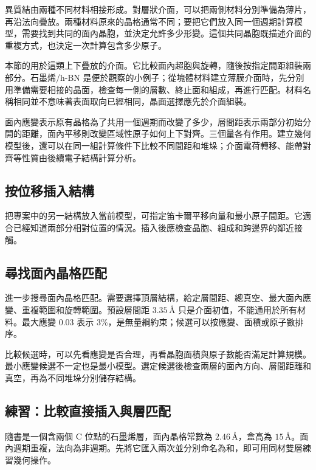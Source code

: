 異質結由兩種不同材料相接形成。對層狀介面，可以把兩側材料分別準備為薄片，再沿法向疊放。兩種材料原來的晶格通常不同；要把它們放入同一個週期計算模型，需要找到共同的面內晶胞，並決定允許多少形變。這個共同晶胞既描述介面的重複方式，也決定一次計算包含多少原子。

本節的用於這類上下疊放的介面。它比較面內超胞與旋轉，隨後按指定間距組裝兩部分。石墨烯/h-BN 是便於觀察的小例子；從塊體材料建立薄膜介面時，先分別用準備需要相接的晶面，檢查每一側的層數、終止面和組成，再進行匹配。材料名稱相同並不意味著表面取向已經相同，晶面選擇應先於介面組裝。

面內應變表示原有晶格為了共用一個週期而改變了多少，層間距表示兩部分初始分開的距離，面內平移則改變區域性原子如何上下對齊。三個量各有作用。建立幾何模型後，還可以在同一組計算條件下比較不同間距和堆垛；介面電荷轉移、能帶對齊等性質由後續電子結構計算分析。

\subsection{按位移插入結構}

把專案中的另一結構放入當前模型，可指定笛卡爾平移向量和最小原子間距。它適合已經知道兩部分相對位置的情況。插入後應檢查晶胞、組成和跨邊界的鄰近接觸。

\subsection{尋找面內晶格匹配}

進一步搜尋面內晶格匹配。需要選擇頂層結構，給定層間距、總真空、最大面內應變、重複範圍和旋轉範圍。預設層間距 $3.35\,\text{\AA}$ 只是介面初值，不能通用於所有材料。最大應變 0.03 表示 3\%，是無量綱約束；候選可以按應變、面積或原子數排序。

比較候選時，可以先看應變是否合理，再看晶胞面積與原子數能否滿足計算規模。最小應變候選不一定也是最小模型。選定候選後檢查兩層的面內方向、層間距離和真空，再為不同堆垛分別儲存結構。

\subsection{練習：比較直接插入與層匹配}

隨書是一個含兩個 C 位點的石墨烯層，面內晶格常數為 $2.46\,\text{\AA}$，盒高為 $15\,\text{\AA}$。面內週期重複，法向為非週期。先將它匯入兩次並分別命名為和，即可用同材雙層練習幾何操作。

